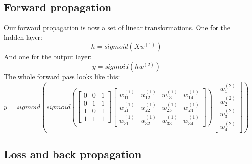 \documentclass[10pt,a4paper]{article}
\begin{document}
\subsection{Forward propagation}
Our forward propagation is now a set of linear transformations. One for the hidden layer:
\begin{equation}
	h = sigmoid(Xw^{(1)})
\end{equation}
And one for the output layer:
\begin{equation}
	y = sigmoid(hw^{(2)})
\end{equation}
The whole forward pass looks like this:
\begin{equation}
	y = sigmoid(sigmoid(
	\begin{bmatrix}
		0 & 0 & 1 \\
		0 & 1 & 1 \\
		1 & 0 & 1 \\
		1 & 1 & 1
	\end{bmatrix}
	\begin{bmatrix}
		w^{(1)}_{11} & w^{(1)}_{12} & w^{(1)}_{13} & w^{(1)}_{14} \\
		w^{(1)}_{21} & w^{(1)}_{22} & w^{(1)}_{23} & w^{(1)}_{24} \\
		w^{(1)}_{31} & w^{(1)}_{32} & w^{(1)}_{33} & w^{(1)}_{34}
	\end{bmatrix}
	)
	\begin{bmatrix}
		w^{(2)}_{1} \\
		w^{(2)}_{2} \\
		w^{(2)}_{3} \\
		w^{(2)}_{4}
	\end{bmatrix}
	)
\end{equation}

\newpage

\subsection{Loss and back propagation}
\end{document}

